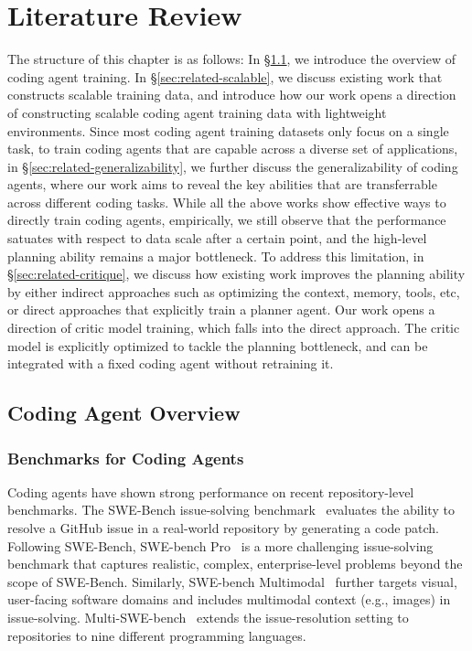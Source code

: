 \documentclass[12pt,openany]{cmuthesis}
\begin{document}
\chapter{Literature Review}

The structure of this chapter is as follows: 
In \S\ref{sec:related-overview}, we introduce the overview of coding agent training. 
In \S\ref{sec:related-scalable}, we discuss existing work that constructs scalable training data, and introduce how our work opens a direction of constructing scalable coding agent training data with lightweight environments.
Since most coding agent training datasets only focus on a single task, to train coding agents that are capable across a diverse set of applications, in \S\ref{sec:related-generalizability}, we further discuss the generalizability of coding agents, where our work aims to reveal the key abilities that are transferrable across different coding tasks.
While all the above works show effective ways to directly train coding agents, empirically, we still observe that the performance satuates with respect to data scale after a certain point, and the high-level planning ability remains a major bottleneck.
To address this limitation, in \S\ref{sec:related-critique}, we discuss how existing work improves the planning ability by either indirect approaches such as optimizing the context, memory, tools, etc, or direct approaches that explicitly train a planner agent.
Our work opens a direction of critic model training, which falls into the direct approach.
The critic model is explicitly optimized to tackle the planning bottleneck, and can be integrated with a fixed coding agent without retraining it.




\section{Coding Agent Overview}
\label{sec:related-overview}
\subsection{Benchmarks for Coding Agents}
Coding agents have shown strong performance on recent repository-level benchmarks.
The SWE-Bench issue-solving benchmark~\cite{swebench} evaluates the ability to resolve a GitHub issue in a real-world repository by generating a code patch.
Following SWE-Bench, SWE-bench Pro~\cite{swebench-pro} is a more challenging issue-solving benchmark that captures realistic, complex, enterprise-level problems beyond the scope of SWE-Bench.
Similarly, SWE-bench Multimodal~\citep{swebench-multimodal} further targets visual, user-facing software domains and includes multimodal context (e.g., images) in issue-solving.
Multi-SWE-bench~\citep{multi-swe-bench} extends the issue-resolution setting to repositories to nine different programming languages.
\end{document}
